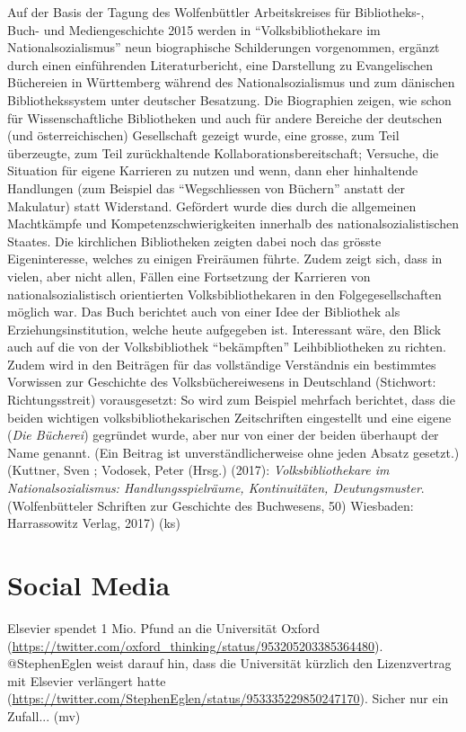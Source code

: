 \documentclass[a4paper,
fontsize=11pt,
oneside,
numbers=noperiodatend,
parskip=half-,
bibliography=totoc,
final
]{scrartcl}
\begin{document}
Auf der Basis der Tagung des Wolfenbüttler Arbeitskreises für
Bibliotheks-, Buch- und Mediengeschichte 2015 werden in
\enquote{Volksbibliothekare im Nationalsozialismus} neun biographische
Schilderungen vorgenommen, ergänzt durch einen einführenden
Literaturbericht, eine Darstellung zu Evangelischen Büchereien in
Württemberg während des Nationalsozialismus und zum dänischen
Bibliothekssystem unter deutscher Besatzung. Die Biographien zeigen, wie
schon für Wissenschaftliche Bibliotheken und auch für andere Bereiche
der deutschen (und österreichischen) Gesellschaft gezeigt wurde, eine
grosse, zum Teil überzeugte, zum Teil zurückhaltende
Kollaborationsbereitschaft; Versuche, die Situation für eigene Karrieren
zu nutzen und wenn, dann eher hinhaltende Handlungen (zum Beispiel das
\enquote{Wegschliessen von Büchern} anstatt der Makulatur) statt
Widerstand. Gefördert wurde dies durch die allgemeinen Machtkämpfe und
Kompetenzschwierigkeiten innerhalb des nationalsozialistischen Staates.
Die kirchlichen Bibliotheken zeigten dabei noch das grösste
Eigeninteresse, welches zu einigen Freiräumen führte. Zudem zeigt sich,
dass in vielen, aber nicht allen, Fällen eine Fortsetzung der Karrieren
von nationalsozialistisch orientierten Volksbibliothekaren in den
Folgegesellschaften möglich war. Das Buch berichtet auch von einer Idee
der Bibliothek als Erziehungsinstitution, welche heute aufgegeben ist.
Interessant wäre, den Blick auch auf die von der Volksbibliothek
\enquote{bekämpften} Leihbibliotheken zu richten. Zudem wird in den
Beiträgen für das vollständige Verständnis ein bestimmtes Vorwissen zur
Geschichte des Volksbüchereiwesens in Deutschland (Stichwort:
Richtungsstreit) vorausgesetzt: So wird zum Beispiel mehrfach berichtet,
dass die beiden wichtigen volksbibliothekarischen Zeitschriften
eingestellt und eine eigene (\emph{Die Bücherei}) gegründet wurde, aber
nur von einer der beiden überhaupt der Name genannt. (Ein Beitrag ist
unverständlicherweise ohne jeden Absatz gesetzt.) (Kuttner, Sven ;
Vodosek, Peter (Hrsg.) (2017): \emph{Volksbibliothekare im
Nationalsozialismus: Handlungsspielräume, Kontinuitäten,
Deutungsmuster}. (Wolfenbütteler Schriften zur Geschichte des
Buchwesens, 50) Wiesbaden: Harrassowitz Verlag, 2017) (ks)

\hypertarget{social-media}{%
\section{Social Media}\label{social-media}}

Elsevier spendet 1 Mio. Pfund an die Universität Oxford
(\url{https://twitter.com/oxford_thinking/status/953205203385364480}).
@StephenEglen weist darauf hin, dass die Universität kürzlich den
Lizenzvertrag mit Elsevier verlängert hatte
(\url{https://twitter.com/StephenEglen/status/953335229850247170}).
Sicher nur ein Zufall... (mv)
\end{document}
